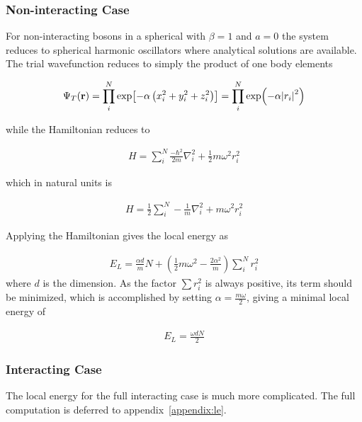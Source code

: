 \subsubsection{Non-interacting Case}
For non-interacting bosons in a spherical with \(\beta = 1\) and \(a = 0\) the
system reduces to spherical harmonic oscillators where analytical solutions are
available. The trial wavefunction reduces to simply the product of one body
elements

\newcommand{\psit}{\Psi_T(\vb{r})}
\newcommand{\onebody}{\prod_{i}^{N}\exp{-\alpha\left[\left( x_i^2 + y_i^2 + \beta
      z_i^2\right)\right]}}
\begin{align*}
  \psit = \prod_{i}^{N}\exp[-\alpha\left( x_{i}^{2}+y_{i}^{2}+z_{i}^{2} \right)] = \prod_{i}^{N}\exp(-\alpha \abs{r_{i}}^{2})
\end{align*}

while the Hamiltonian reduces to

\begin{align*}
  H = \sum_{i}^{N} \frac{-\hbar^{2}}{2m}\nabla_{i}^{2} + \frac{1}{2}m\omega^{2}r_{i}^{2}
\end{align*}

which in natural units is

\newcommand{\lapl}[1]{\nabla_{#1}^2}
\begin{align*}
  H = \frac{1}{2}\sum_{i}^{N} -\frac{1}{m}\lapl{i} + m\omega^{2}r_{i}^{2}
\end{align*}

Applying the Hamiltonian gives the local energy as

\begin{align*}
  E_{L} = \frac{\alpha d}{m} N + \left( \frac{1}{2}m\omega^{2} - \frac{2\alpha^{2}}{m} \right)\sum_{i}^{N}r_{i}^{2}
\end{align*}
 where \(d\) is the dimension. As the factor \(\sum r_{i}^{2}\) is always
 positive, its term should be minimized, which is accomplished by setting
 \(\alpha = \frac{m\omega}{2}\), giving a minimal local energy of

 \begin{align*}
   E_{L} = \frac{\omega d N}{2}
   \end{align*}

\subsubsection{Interacting Case}
The local energy for the full interacting case is much more complicated. The
full computation is deferred to appendix~\ref{appendix:le}.





